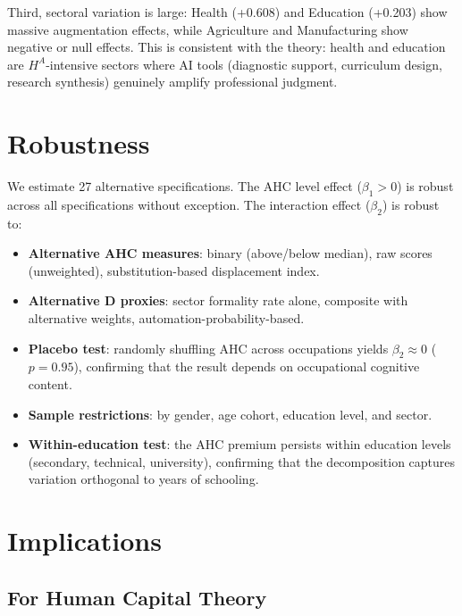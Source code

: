 \documentclass[a4paper,fleqn]{cas-dc}
\begin{document}
Third, sectoral variation is large: Health (+0.608) and Education (+0.203) show massive augmentation effects, while Agriculture and Manufacturing show negative or null effects. This is consistent with the theory: health and education are $H^A$-intensive sectors where AI tools (diagnostic support, curriculum design, research synthesis) genuinely amplify professional judgment.


\section{Robustness}
\label{sec:robustness}

We estimate 27 alternative specifications. The AHC level effect ($\beta_1 > 0$) is robust across all specifications without exception. The interaction effect ($\beta_2$) is robust to:

\begin{itemize}
\item \textbf{Alternative AHC measures}: binary (above/below median), raw scores (unweighted), substitution-based displacement index.
\item \textbf{Alternative D proxies}: sector formality rate alone, composite with alternative weights, automation-probability-based.
\item \textbf{Placebo test}: randomly shuffling AHC across occupations yields $\beta_2 \approx 0$ ($p = 0.95$), confirming that the result depends on occupational cognitive content.
\item \textbf{Sample restrictions}: by gender, age cohort, education level, and sector.
\item \textbf{Within-education test}: the AHC premium persists within education levels (secondary, technical, university), confirming that the decomposition captures variation orthogonal to years of schooling.
\end{itemize}


\section{Implications}
\label{sec:implications}

\subsection{For Human Capital Theory}
\end{document}
